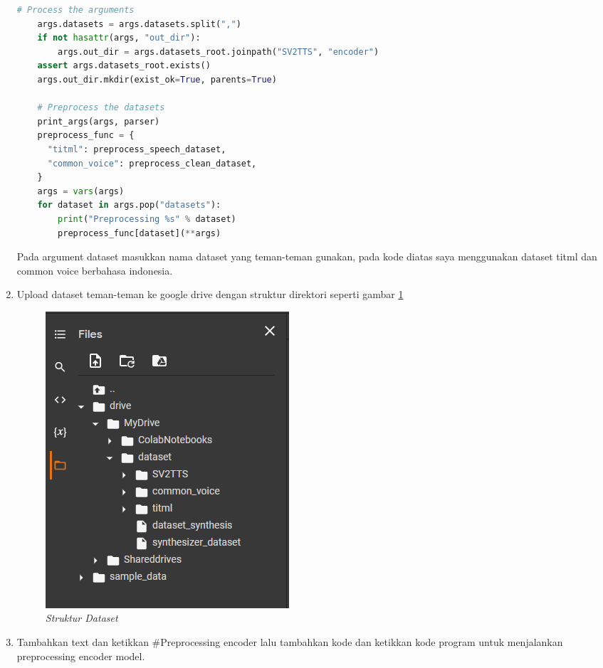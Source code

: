 \begin{enumerate}
\begin{lstlisting}[language=Python, caption=Preprocessing Encoder Model, label=lstencoder]
    # Process the arguments
    args.datasets = args.datasets.split(",")
    if not hasattr(args, "out_dir"):
        args.out_dir = args.datasets_root.joinpath("SV2TTS", "encoder")
    assert args.datasets_root.exists()
    args.out_dir.mkdir(exist_ok=True, parents=True)

    # Preprocess the datasets
    print_args(args, parser)
    preprocess_func = {
      "titml": preprocess_speech_dataset,
      "common_voice": preprocess_clean_dataset, 
    }
    args = vars(args)
    for dataset in args.pop("datasets"):
        print("Preprocessing %s" % dataset)
        preprocess_func[dataset](**args)
\end{lstlisting}

Pada argument dataset masukkan nama dataset yang teman-teman gunakan, pada kode diatas saya menggunakan dataset titml dan common voice berbahasa indonesia.

\item Upload dataset teman-teman ke google drive dengan struktur direktori seperti gambar \ref{colab9}
\begin{figure}[H]
    \centering
    \includegraphics[scale=0.75]{figures/colab9}
    \caption{\textit{Struktur Dataset}}
    \label{colab9}
\end{figure}

\item Tambahkan text dan ketikkan \#Preprocessing encoder lalu tambahkan kode dan ketikkan kode program untuk menjalankan preprocessing encoder model.


\end{enumerate}
